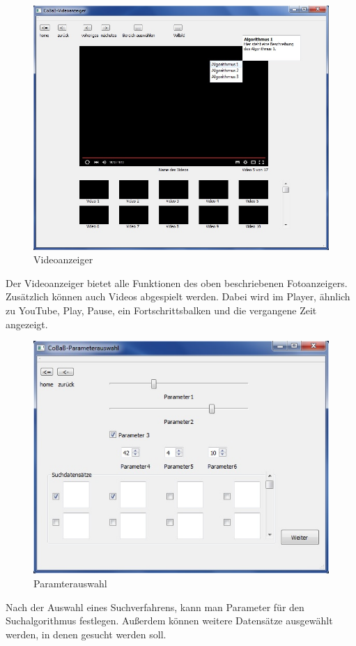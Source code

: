 \begin{figure}[H]
\includegraphics[width=1\linewidth]{img/Videoanzeiger}
\caption{Videoanzeiger}
\label{fig:videoanzeiger}
\end{figure}
Der Videoanzeiger bietet alle Funktionen des oben beschriebenen Fotoanzeigers. Zusätzlich können auch Videos abgespielt werden. Dabei wird im Player, ähnlich zu YouTube, Play, Pause, ein Fortschrittsbalken und die vergangene Zeit angezeigt. 

\begin{figure}[H]
\includegraphics[width=1\linewidth]{img/Parameterauswahl}
\caption{Paramterauswahl}
\label{fig:parameterauswahl}
\end{figure}
Nach der Auswahl eines Suchverfahrens, kann man Parameter für den Suchalgorithmus festlegen. Außerdem können weitere Datensätze ausgewählt werden, in denen gesucht werden soll.

